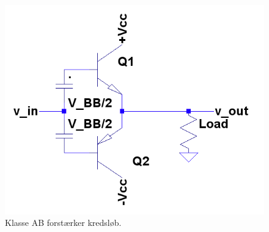 \begin{figure}[h]
\centering
\includegraphics[scale=.35]{klasser/classab.png}
\caption{Klasse AB forstærker kredsløb.}
\label{fig:classab}
\end{figure}


